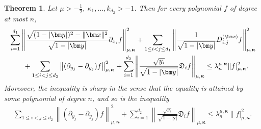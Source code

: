 \documentclass{amsart}
\newtheorem{thm}{Theorem}[section]
\theoremstyle{remark}
\def\fD{{\mathfrak D}}
\def\k{{\kappa}}
\def\l{{\lambda}}
\def\bk{{\boldsymbol{\kappa}}}
\def\f{\frac}
\begin{document}
\begin{thm} \label{thm:Bernstein}
Let  $\mu > -\f12$, $\k_1,\ldots, k_{d_2} > -1$. Then for every polynomial $f$ of degree at most $n$, 
\begin{align}\label{eq:B1}
  &  \sum_{i=1}^{d_1}  \left \| \frac{\sqrt{(1-|\bm y|)^2- \|\bm x\|^2}}{\sqrt{1-|\bm y|}} \partial_{x_i} f \right \|_{\mu,\bk}^2  
   + \sum_{1 \le i< j \le d_1}  \left\|   \frac{1}{\sqrt{1-|\bm y|}} D_{i,j}^{(\bm x)} f \right \|_{\mu,\bk}^2 \\
  &\qquad +  \sum_{1\le i< j \le d_2} \left \| (\partial_{y_j} - \partial_{y_j}) f  \right \|_{\mu,\bk}^2 +
     \sum_{i=1}^{d_2} \left \| \frac{\sqrt{y_i}}{\sqrt{1-|\bm y|}}  \fD_i f \right \|_{\mu,\bk} \le \l_n^{\mu,\bk} \| f |_{\mu,\bk}^2.  \notag
\end{align}
Moreover, the inequality is sharp in the sense that the equality is attained by some polynomial of degree $n$, and 
so is the inequality  
\begin{align}\label{eq:B2}
  \sum_{1\le i< j \le d_2} \left \| (\partial_{y_j} - \partial_{y_j}) f  \right \|_{\mu,\bk}^2 +
     \sum_{i=1}^{d_2} \left \| \frac{\sqrt{y_i}}{\sqrt{1-|\bm y|}}  \fD_i f \right \|_{\mu,\bk} \le \l_n^{\mu,\bk} \| f |_{\mu,\bk}^2.
\end{align}
\end{thm}
\end{document}
